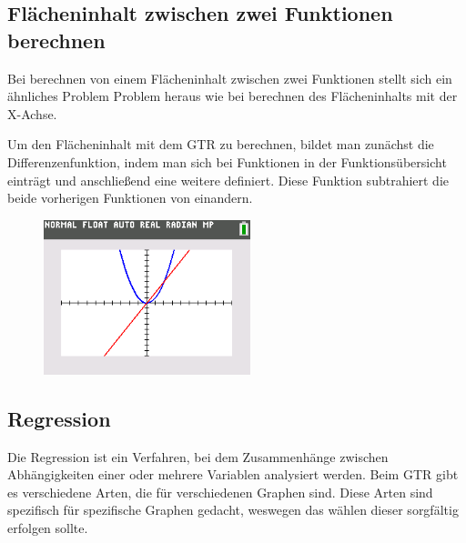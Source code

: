 \subsection{Flächeninhalt zwischen zwei Funktionen berechnen}
Bei berechnen von einem Flächeninhalt zwischen zwei Funktionen stellt sich ein ähnliches Problem Problem heraus wie bei berechnen des Flächeninhalts mit der X-Achse.
\begin{paracol}{2}
	\begin{flushleft}
	Um den Flächeninhalt mit dem GTR zu berechnen, bildet man zunächst die Differenzenfunktion, indem man sich bei Funktionen in der Funktionsübersicht einträgt und anschließend eine weitere definiert. Diese Funktion subtrahiert die beide vorherigen Funktionen von einandern. 
	\end{flushleft}
\switchcolumn
	\begin{flushright}
		\begin{figure}
			\includegraphics[width=6cm]{Media/GRT/Visualisierung/Flaecheninhalt_zwischen_zwei_Funktionen_berechnen/Flaecheninhalt_zwischen_zwei_Funktionen_berechnen.png}
		\caption{}
		\end{figure}
	\end{flushright}
\end{paracol}
\pagebreak
\subsection{Regression}
Die Regression ist ein Verfahren, bei dem Zusammenhänge zwischen Abhängigkeiten einer oder mehrere Variablen analysiert werden. Beim GTR gibt es verschiedene Arten, die für verschiedenen Graphen sind. Diese Arten sind spezifisch für spezifische Graphen gedacht, weswegen das wählen dieser sorgfältig erfolgen sollte. 

